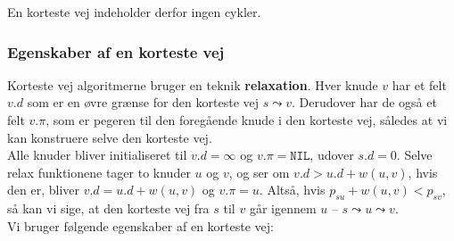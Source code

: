 En korteste vej indeholder derfor ingen cykler.

\subsubsection{Egenskaber af en korteste vej}
Korteste vej algoritmerne bruger en teknik \textbf{relaxation}. Hver knude $v$ har et felt $v.d$ som er en øvre grænse for den korteste vej  $s \leadsto v$. Derudover har de også et felt $v.\pi$, som er pegeren til den foregående knude i den korteste vej, således at vi kan konstruere selve den korteste vej.\\

Alle knuder bliver initialiseret til $v.d = \infty$ og $v.\pi=\texttt{NIL}$, udover $s.d=0$. Selve relax funktionene tager to knuder $u$ og $v$, og ser om $v.d > u.d + w(u,v)$, hvis den er, bliver $v.d = u.d + w(u,v)$ og $v.\pi = u$. Altså, hvis $p_{su} + w(u,v) < p_{sv}$, så kan vi sige, at den korteste vej fra $s$ til $v$ går igennem $u$ -- $s \leadsto u \leadsto v$.\\

Vi bruger følgende egenskaber af en korteste vej:\\

